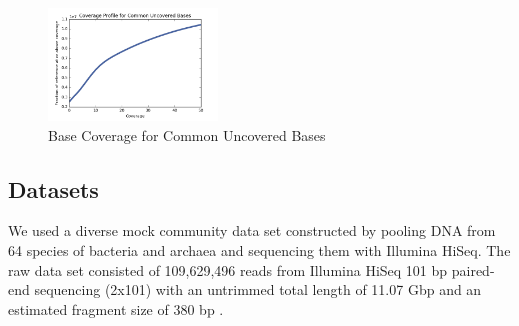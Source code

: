 \documentclass[10pt,a4paper,twocolumn]{article}
\begin{document}
\begin{figure}[!h]
\centering
\includegraphics[width=0.4\textwidth]{CommonUncoveredCoverageProfile.png} 
\caption{Base Coverage for Common Uncovered Bases}
\label{fig:CommonUncovered}
\end{figure}







 

\subsection*{Datasets}

We used a diverse mock community data set constructed by pooling DNA from 64 species of bacteria and archaea and sequencing them with Illumina HiSeq.  The raw data set consisted of 109,629,496 reads from Illumina HiSeq 101 bp paired-end sequencing (2x101) with
an untrimmed total length of 11.07 Gbp and an estimated fragment size of 380 bp
\cite{podar}. 
 
\end{document}
